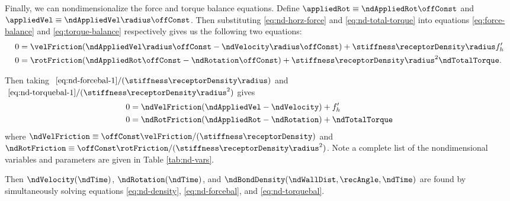 Finally, we can nondimensionalize the force and torque balance
equations. Define $\appliedRot \equiv \ndAppliedRot \offConst$ and
$\appliedVel \equiv \ndAppliedVel \radius \offConst$. Then
substituting \eqref{eq:nd-horz-force} and \eqref{eq:nd-total-torque}
into equations \eqref{eq:force-balance} and \eqref{eq:torque-balance}
respectively gives us the following two equations:
\begin{align}
  \label{eq:nd-forcebal-1}
  0 &= \velFriction (\ndAppliedVel \radius \offConst - \ndVelocity
      \radius \offConst) + \stiffness \receptorDensity \radius f'_h \\
  \label{eq:nd-torquebal-1}
  0 &= \rotFriction (\ndAppliedRot \offConst - \ndRotation \offConst)
      + \stiffness \receptorDensity \radius^2 \ndTotalTorque.
\end{align}

Then taking
$~\eqref{eq:nd-forcebal-1}/(\stiffness \receptorDensity \radius)$ and
$~\eqref{eq:nd-torquebal-1}/(\stiffness \receptorDensity \radius^2)$
gives
\begin{align}
  \label{eq:nd-forcebal}
  0 &= \ndVelFriction (\ndAppliedVel - \ndVelocity) + f'_h \\ 
  \label{eq:nd-torquebal}
  0 &= \ndRotFriction (\ndAppliedRot - \ndRotation) + \ndTotalTorque
\end{align}
where $\ndVelFriction \equiv \offConst \velFriction / (\stiffness
\receptorDensity)$ and $\ndRotFriction \equiv \offConst \rotFriction /
(\stiffness \receptorDensity \radius^2)$. Note a complete list of the
nondimensional variables and parameters are given in Table
\ref{tab:nd-vars}.

Then $\ndVelocity(\ndTime)$, $\ndRotation(\ndTime)$, and
$\ndBondDensity(\ndWallDist, \recAngle, \ndTime)$ are found by
simultaneously solving equations \eqref{eq:nd-density},
\eqref{eq:nd-forcebal}, and \eqref{eq:nd-torquebal}.


